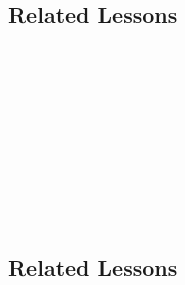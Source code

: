 \subsection{Related Lessons}
\fourbOne{}\\
\fourgFour{}\\
\fourgFive{}\\
\fouriOne{}\\
\fouriTwo{}\\
\fourkTwo{}\\
\fourFKOne{}\\
\fourFKThree{}\\
\fourFKSeven{}\\
%
\subsection{Related Lessons}
\fourbOne{}\\
\fourgFour{}\\
\fourgFive{}\\
\fourFKOne{}\\
\fourFKSeven{}\\
\fourFKEight{}\\
